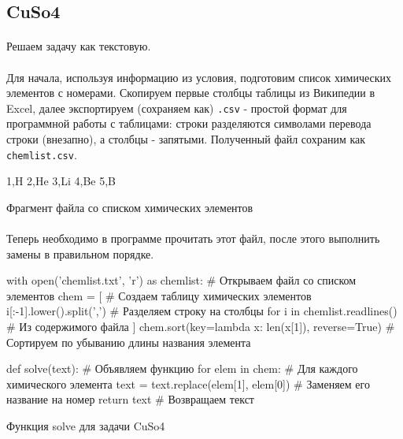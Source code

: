\documentclass[12pt]{article}
\begin{document}
    \subsection{CuSo4}
    \paragraph{}
    Решаем задачу как текстовую.
    \paragraph{}
    Для начала, используя информацию из условия, подготовим список химических элементов с номерами.
    Скопируем первые столбцы таблицы из Википедии в Excel, далее экспортируем (сохраняем как) \verb|.csv| -
    простой формат для программной работы с таблицами: строки разделяются символами перевода строки (внезапно),
    а столбцы - запятыми.
    Полученный файл сохраним как \verb|chemlist.csv|.
    \begin{listing}[H]
        \begin{pythoncode}
1,H
2,He
3,Li
4,Be
5,B
        \end{pythoncode}
        \caption{Фрагмент файла со списком химических элементов}
        \label{lst:chemlist}
    \end{listing}

    \paragraph{}
    Теперь необходимо в программе прочитать этот файл, после этого выполнить замены в правильном порядке.
    \begin{listing}[H]
        \begin{pythoncode}
with open('chemlist.txt', 'r') as chemlist:      # Открываем файл со списком элементов
    chem = [                                     # Создаем таблицу химических элементов
        i[:-1].lower().split(',')                # Разделяем строку на столбцы
        for i in chemlist.readlines()            # Из содержимого файла
    ]
chem.sort(key=lambda x: len(x[1]), reverse=True) # Сортируем по убыванию длины названия элемента

def solve(text):                                 # Объявляем функцию
    for elem in chem:                            # Для каждого химического элемента
        text = text.replace(elem[1], elem[0])    # Заменяем его название на номер
    return text                                  # Возвращаем текст
        \end{pythoncode}
        \caption{Функция solve для задачи CuSo4}
        \label{lst:solve23}
    \end{listing}
\end{document}
